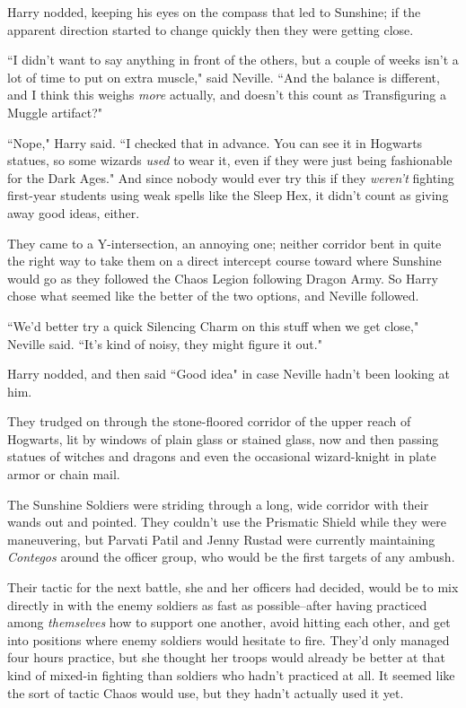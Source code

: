 Harry nodded, keeping his eyes on the compass that led to Sunshine; if the apparent direction started to change quickly then they were getting close.

``I didn't want to say anything in front of the others, but a couple of weeks isn't a lot of time to put on extra muscle," said Neville. ``And the balance is different, and I think this weighs \emph{more} actually, and doesn't this count as Transfiguring a Muggle artifact?"

``Nope," Harry said. ``I checked that in advance. You can see it in Hogwarts statues, so some wizards \emph{used} to wear it, even if they were just being fashionable for the Dark Ages." And since nobody would ever try this if they \emph{weren't} fighting first-year students using weak spells like the Sleep Hex, it didn't count as giving away good ideas, either.

They came to a Y-intersection, an annoying one; neither corridor bent in quite the right way to take them on a direct intercept course toward where Sunshine would go as they followed the Chaos Legion following Dragon Army. So Harry chose what seemed like the better of the two options, and Neville followed.

``We'd better try a quick Silencing Charm on this stuff when we get close," Neville said. ``It's kind of noisy, they might figure it out."

Harry nodded, and then said ``Good idea" in case Neville hadn't been looking at him.

They trudged on through the stone-floored corridor of the upper reach of Hogwarts, lit by windows of plain glass or stained glass, now and then passing statues of witches and dragons and even the occasional wizard-knight in plate armor or chain mail.

\later

The Sunshine Soldiers were striding through a long, wide corridor with their wands out and pointed. They couldn't use the Prismatic Shield while they were maneuvering, but Parvati Patil and Jenny Rustad were currently maintaining \emph{Contegos} around the officer group, who would be the first targets of any ambush.

Their tactic for the next battle, she and her officers had decided, would be to mix directly in with the enemy soldiers as fast as possible\---after having practiced among \emph{themselves} how to support one another, avoid hitting each other, and get into positions where enemy soldiers would hesitate to fire. They'd only managed four hours practice, but she thought her troops would already be better at that kind of mixed-in fighting than soldiers who hadn't practiced at all. It seemed like the sort of tactic Chaos would use, but they hadn't actually used it yet.

